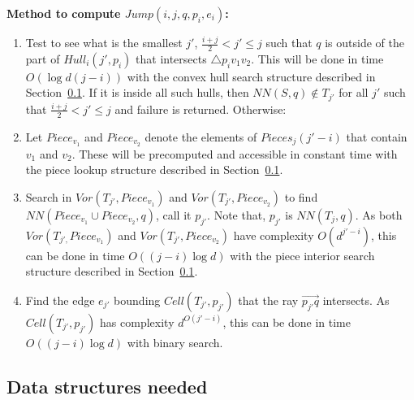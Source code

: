 \documentclass[10pt,a4paper]{amsart}
\newcommand{\ovar}[1]{\overrightarrow{#1}}
\newcommand{\Cell}{\mathit{Cell}}
\newcommand{\Piece}{\mathit{Piece}}
\newcommand{\Pieces}{\mathit{Pieces}}
\newcommand{\Hull}{\mathit{Hull}}
\newcommand{\NN}{\mathit{NN}}
\newcommand{\Voron}{\mathit{Vor}}
\begin{document}
\noindent \textbf{Method to compute $Jump(i,j,q,p_i,e_i)$:}
    \begin{enumerate}
        \item \label{jumpstep1} Test to see what is the smallest $j'$, $\frac{i+j}{2}< j'\leq j$ such that  $q$ is outside of the part of $\Hull_i(j',p_i)$ that intersects $\triangle p_iv_1v_2$. This will be done in time $O(\log d(j-i))$ with the convex hull search structure described in Section~\ref{sec:aux-datastr}. If it is inside all such hulls, then $\NN(S,q) \not \in T_{j'}$ for all $j'$ such that $\frac{i+j}{2}< j'\leq j$ and failure is returned. Otherwise:
        \item Let $\Piece_{v_1}$ and $\Piece_{v_2}$ denote the elements of $\Pieces_j(j'-i)$ that contain $v_1$ and $v_2$. These will be precomputed and accessible in constant time with the piece lookup  structure described in Section~\ref{sec:aux-datastr}.
        \item Search in $\Voron(T_{j'},\Piece_{v_1})$ and $\Voron(T_{j'},\Piece_{v_2})$ to find $\NN(\Piece_{v_1} \cup \Piece_{v_2},q)$, call it $p_{j'}$. Note that, $p_{j'}$ is $\NN(T_j,q)$.
         As both $\Voron(T_{j',}\Piece_{v_1})$ and $\Voron(T_{j'},\Piece_{v_2})$ have complexity $O(d^{j'-i})$, this can be done in time $O((j-i)\log d)$ 
         with the piece interior search  structure described in Section~\ref{sec:aux-datastr}.
        \item Find the edge $e_{j'}$ bounding $\Cell(T_{j'},p_{j'})$ that the ray $\ovar{p_{j'}q}$ intersects. As $\Cell(T_{j'},p_{j'})$ has complexity $d^{O(j'-i)}$, this can be done in time $O((j-i)\log d)$ with binary search.
    \end{enumerate}


\subsection{Data structures needed}
\label{sec:aux-datastr}
\end{document}
